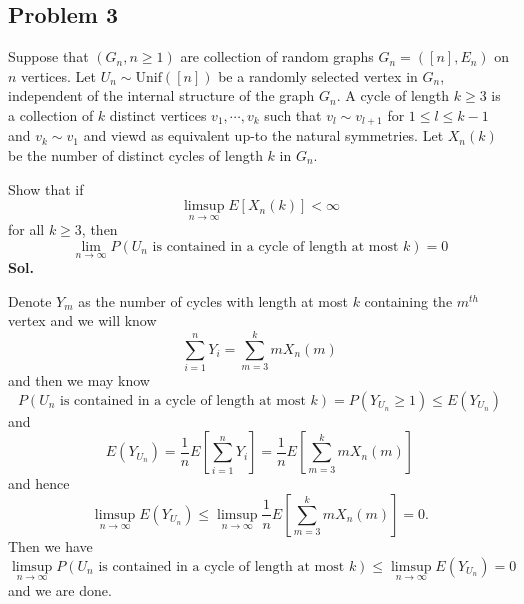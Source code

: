 \documentclass[lang=en,11pt,a4paper,citestyle =authoryear]{elegantpaper}
\begin{document}
\subsection*{Problem 3} 
Suppose that $(G_n, n\geq 1)$ are collection of random graphs $G_n = ([n],E_n)$ on $n$ vertices. Let $U_n \sim \text{Unif}([n])$ be a randomly selected vertex in $G_n$, independent of the internal structure of the graph $G_n$. A cycle of length $k\geq 3$ is a collection of $k$ distinct vertices $v_1,\cdots,v_k$ such that $v_l \sim v_{l+1}$ for $1\leq l\leq k-1$ and $v_k\sim v_1$ and viewd as equivalent up-to the natural symmetries. Let $X_n(k)$ be the number of distinct cycles of length $k$ in $G_n$.\par
Show that if
\[\limsup_{n\to\infty} E[X_n(k)] < \infty\]
for all $k\geq 3$, then
\[\lim_{n\to\infty} P(U_n\text{ is contained in a cycle of length at most }k ) = 0\]
\vspace{0.5em}
\textbf{Sol.} \par
Denote $Y_m$ as the number of cycles with length at most $k$ containing the $m^{th}$ vertex and we will know
\[
\sum\limits_{i=1}^n Y_i = \sum\limits_{m=3}^k mX_n(m)
\]
and then we may know
\[
P(U_n\text{ is contained in a cycle of length at most }k ) = P(Y_{U_n} \geq 1) \leq E(Y_{U_n})
\]
and
\[
E(Y_{U_n}) = \dfrac{1}{n}E\left[\sum\limits_{i=1}^n Y_i\right] = \dfrac{1}{n}E\left[\sum\limits_{m=3}^k mX_n(m)\right] 
\]
and hence
\[
\limsup_{n\to\infty} E(Y_{U_n}) \leq \limsup_{n\to\infty}\dfrac{1}{n}E\left[\sum\limits_{m=3}^k mX_n(m)\right]  = 0.
\]
Then we have
\[
\limsup_{n\to\infty} P(U_n\text{ is contained in a cycle of length at most }k ) \leq \limsup_{n\to\infty} E(Y_{U_n}) = 0
\]
and we are done.
\par 
\vspace{0.5em}

\addappheadtotoc
\end{document}
